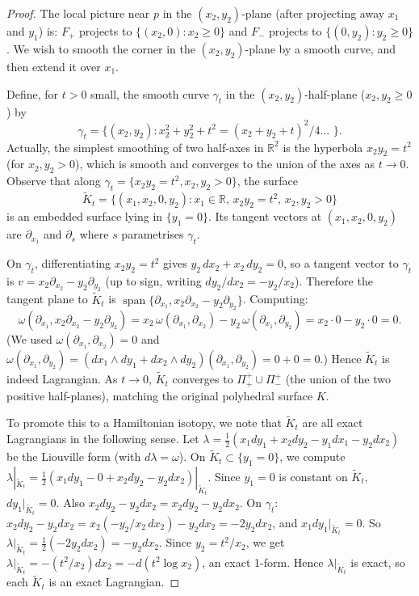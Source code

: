 \documentclass[12pt]{article}
\theoremstyle{definition}
\DeclareMathOperator{\Span}{span}
\begin{document}
\begin{proof}
The local picture near $p$ in the $(x_2, y_2)$-plane (after projecting away $x_1$ and $y_1$) is: $F_+$ projects to $\{(x_2, 0) : x_2 \geq 0\}$ and $F_-$ projects to $\{(0, y_2) : y_2 \geq 0\}$. We wish to smooth the corner in the $(x_2, y_2)$-plane by a smooth curve, and then extend it over $x_1$.

Define, for $t > 0$ small, the smooth curve $\gamma_t$ in the $(x_2,y_2)$-half-plane ($x_2,y_2 \geq 0$) by
\begin{equation}
\label{eq:gamma_t}
  \gamma_t = \{(x_2, y_2) : x_2^2 + y_2^2 + t^2 = (x_2+y_2+t)^2 / 4 \text{... }\}.
\end{equation}
Actually, the simplest smoothing of two half-axes in $\mathbb{R}^2$ is the hyperbola $x_2 y_2 = t^2$ (for $x_2, y_2 > 0$), which is smooth and converges to the union of the axes as $t\to 0$. Observe that along $\gamma_t = \{x_2 y_2 = t^2, x_2, y_2 > 0\}$, the surface
\begin{equation}
\label{eq:Kt_local}
  \tilde{K}_t = \{(x_1, x_2, 0, y_2) : x_1 \in \mathbb{R},\, x_2 y_2 = t^2,\, x_2, y_2 > 0\}
\end{equation}
is an embedded surface lying in $\{y_1=0\}$. Its tangent vectors at $(x_1, x_2, 0, y_2)$ are $\partial_{x_1}$ and $\partial_s$ where $s$ parametrises $\gamma_t$.

On $\gamma_t$, differentiating $x_2 y_2 = t^2$ gives $y_2\, dx_2 + x_2\, dy_2 = 0$, so a tangent vector to $\gamma_t$ is $v = x_2 \partial_{x_2} - y_2 \partial_{y_2}$ (up to sign, writing $dy_2/dx_2 = -y_2/x_2$). Therefore the tangent plane to $\tilde{K}_t$ is $\Span\{\partial_{x_1}, x_2\partial_{x_2} - y_2\partial_{y_2}\}$. Computing:
\[
  \omega(\partial_{x_1}, x_2\partial_{x_2} - y_2\partial_{y_2})
  = x_2 \,\omega(\partial_{x_1},\partial_{x_2}) - y_2\,\omega(\partial_{x_1},\partial_{y_2})
  = x_2 \cdot 0 - y_2 \cdot 0 = 0.
\]
(We used $\omega(\partial_{x_1},\partial_{x_2}) = 0$ and $\omega(\partial_{x_1},\partial_{y_2}) = (dx_1\wedge dy_1 + dx_2\wedge dy_2)(\partial_{x_1},\partial_{y_2}) = 0 + 0 = 0$.) Hence $\tilde{K}_t$ is indeed Lagrangian. As $t\to 0$, $\tilde{K}_t$ converges to $\Pi_+^+ \cup \Pi_-^+$ (the union of the two positive half-planes), matching the original polyhedral surface $K$.

To promote this to a Hamiltonian isotopy, we note that $\tilde{K}_t$ are all exact Lagrangians in the following sense. Let $\lambda = \frac{1}{2}(x_1 dy_1 + x_2 dy_2 - y_1 dx_1 - y_2 dx_2)$ be the Liouville form (with $d\lambda = \omega$). On $\tilde{K}_t \subset \{y_1=0\}$, we compute $\lambda|_{\tilde{K}_t} = \frac{1}{2}(x_1 dy_1 - 0 + x_2 dy_2 - y_2 dx_2)|_{\tilde{K}_t}$. Since $y_1=0$ is constant on $\tilde{K}_t$, $dy_1|_{\tilde{K}_t}=0$. Also $x_2 dy_2 - y_2 dx_2 = x_2 dy_2 - y_2 dx_2$. On $\gamma_t$: $x_2 dy_2 - y_2 dx_2 = x_2(-y_2/x_2\, dx_2) - y_2 dx_2 = -2y_2 dx_2$, and $x_1 dy_1|_{\tilde{K}_t}=0$. So $\lambda|_{\tilde{K}_t} = \frac{1}{2}(-2y_2 dx_2) = -y_2 dx_2$. Since $y_2 = t^2/x_2$, we get $\lambda|_{\tilde{K}_t} = -(t^2/x_2)dx_2 = -d(t^2 \log x_2)$, an exact 1-form. Hence $\lambda|_{\tilde{K}_t}$ is exact, so each $\tilde{K}_t$ is an exact Lagrangian.


\end{proof}
\end{document}
